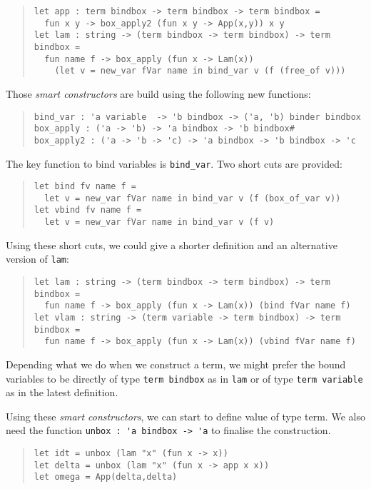 \documentclass[11pt]{article}
\begin{document}
\begin{quote}
\begin{verbatim}
let app : term bindbox -> term bindbox -> term bindbox =
  fun x y -> box_apply2 (fun x y -> App(x,y)) x y
let lam : string -> (term bindbox -> term bindbox) -> term bindbox =
  fun name f -> box_apply (fun x -> Lam(x))
    (let v = new_var fVar name in bind_var v (f (free_of v)))
\end{verbatim}
\end{quote}

Those \emph{smart constructors} are build using the following new functions:
\begin{quote}
\begin{verbatim}
bind_var : 'a variable  -> 'b bindbox -> ('a, 'b) binder bindbox
box_apply : ('a -> 'b) -> 'a bindbox -> 'b bindbox#
box_apply2 : ('a -> 'b -> 'c) -> 'a bindbox -> 'b bindbox -> 'c
\end{verbatim}
\end{quote}

The key function to bind variables is \verb#bind_var#. Two short cuts
are provided:
\begin{quote}
\begin{verbatim}
let bind fv name f =
  let v = new_var fVar name in bind_var v (f (box_of_var v))
let vbind fv name f =
  let v = new_var fVar name in bind_var v (f v)
\end{verbatim}
\end{quote}

Using these short cuts, we could give a shorter definition and an
alternative version of \verb#lam#:

\begin{quote}
\begin{verbatim}
let lam : string -> (term bindbox -> term bindbox) -> term bindbox =
  fun name f -> box_apply (fun x -> Lam(x)) (bind fVar name f)
let vlam : string -> (term variable -> term bindbox) -> term bindbox =
  fun name f -> box_apply (fun x -> Lam(x)) (vbind fVar name f)
\end{verbatim}
\end{quote}

Depending what we do when we construct a term, we might prefer
the bound variables to be directly of type \verb#term bindbox# as in
\verb#lam# or of type \verb#term variable# as in the latest definition.

Using these \emph{smart constructors}, we can start to define value of
type term. We also need the function \verb#unbox : 'a bindbox -> 'a#
to finalise the construction.
\begin{quote}
\begin{verbatim}
let idt = unbox (lam "x" (fun x -> x))
let delta = unbox (lam "x" (fun x -> app x x))
let omega = App(delta,delta)
\end{verbatim}
\end{quote}
\end{document}
